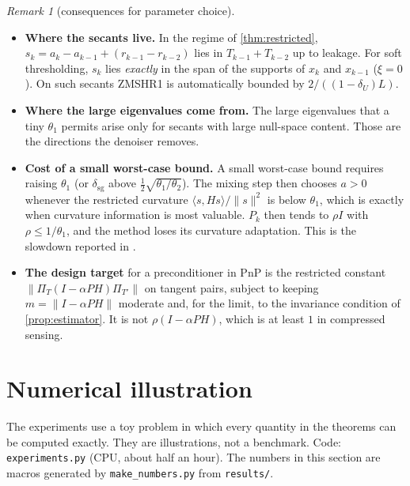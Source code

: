 \documentclass[11pt]{article}
\theoremstyle{definition}
\theoremstyle{remark}
\newtheorem{remark}[theorem]{Remark}
\newcommand{\inner}[2]{\langle #1,#2\rangle}
\newcommand{\norm}[1]{\lVert #1\rVert}
\newcommand{\dsg}{\delta_{\mathrm{sg}}}
\begin{document}
\begin{remark}[consequences for parameter choice]\label{rem:theta}
\begin{itemize}
\item \textbf{Where the secants live.} In the regime of \cref{thm:restricted}, $s_k=a_k-a_{k-1}+(r_{k-1}-r_{k-2})$
  lies in $T_{k-1}+T_{k-2}$ up to leakage. For soft thresholding, $s_k$ lies \emph{exactly} in the span of the
  supports of $x_k$ and $x_{k-1}$ ($\xi=0$). On such secants ZMSHR1 is automatically bounded by
  $2/((1-\delta_U)L)$.
\item \textbf{Where the large eigenvalues come from.} The large eigenvalues that a tiny $\theta_1$ permits arise
  only for secants with large null-space content. Those are the directions the denoiser removes.
\item \textbf{Cost of a small worst-case bound.} A small worst-case bound requires raising $\theta_1$ (or $\dsg$
  above $\frac12\sqrt{\theta_1/\theta_2}$). The mixing step then chooses $a>0$ whenever the restricted curvature
  $\inner s{Hs}/\norm s^2$ is below $\theta_1$, which is exactly when curvature information is most valuable.
  $P_k$ then tends to $\rho I$ with $\rho\leq1/\theta_1$, and the method loses its curvature adaptation. This is
  the slowdown reported in \cite{hong2024p2np}.
\item \textbf{The design target} for a preconditioner in PnP is the restricted constant
  $\norm{\Pi_T(I-\alpha PH)\Pi_{T'}}$ on tangent pairs, subject to keeping $m=\norm{I-\alpha PH}$ moderate and,
  for the limit, to the invariance condition of \cref{prop:estimator}. It is not $\rho(I-\alpha PH)$, which is
  at least $1$ in compressed sensing.
\end{itemize}
\end{remark}

\section{Numerical illustration}\label{sec:numerics}

The experiments use a toy problem in which every quantity in the theorems can be computed exactly. They are
illustrations, not a benchmark. Code: \texttt{experiments.py} (CPU, about half an hour). The numbers in this section
are macros generated by \texttt{make\_numbers.py} from \texttt{results/}.
\end{document}

